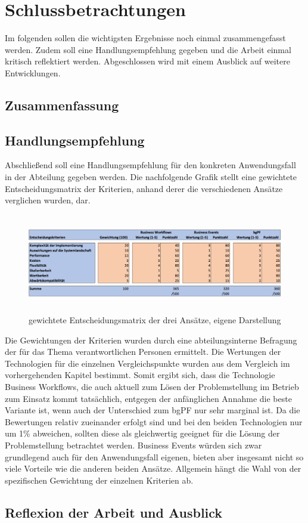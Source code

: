 \chapter{Schlussbetrachtungen}

Im folgenden sollen die wichtigsten Ergebnisse noch einmal zusammengefasst werden. Zudem soll eine Handlungsempfehlung gegeben und die Arbeit einmal kritisch reflektiert werden. Abgeschlossen wird mit einem Ausblick auf weitere Entwicklungen.

\section{Zusammenfassung}



\section{Handlungsempfehlung}

Abschlie{\ss}end soll eine Handlungsempfehlung für den konkreten Anwendungsfall in der Abteilung gegeben werden. Die nachfolgende Grafik stellt eine gewichtete Entscheidungsmatrix der Kriterien, anhand derer die verschiedenen Ansätze verglichen wurden, dar.

\begin{figure}[H]
 \centering
 \includegraphics[height=4.3cm]{Bilder/Handlungsempfehlung_Entscheidungsmatrix.png}
 \caption[gewichtete Entscheidungsmatrix der drei Ansätze]{gewichtete Entscheidungsmatrix der drei Ansätze, eigene Darstellung}
 \label{fig:iso_norm}
\end{figure}

Die Gewichtungen der Kriterien wurden durch eine abteilungsinterne Befragung der für das Thema verantwortlichen Personen ermittelt. Die Wertungen der Technologien für die einzelnen Vergleichspunkte wurden aus dem Vergleich im vorhergehenden Kapitel bestimmt. Somit ergibt sich, dass die Technologie Business Workflows, die auch aktuell zum Lösen der Problemstellung im Betrieb zum Einsatz kommt tatsächlich, entgegen der anfänglichen Annahme die beste Variante ist, wenn auch der Unterschied zum bgPF nur sehr marginal ist. Da die Bewertungen relativ zueinander erfolgt sind und bei den beiden Technologien nur um 1\% abweichen, sollten diese als gleichwertig geeignet für die Lösung der Problemstellung betrachtet werden. Business Events würden sich zwar grundlegend auch für den Anwendungsfall eigenen, bieten aber insgesamt nicht so viele Vorteile wie die anderen beiden Ansätze. Allgemein hängt die Wahl von der spezifischen Gewichtung der einzelnen Kriterien ab. 

\section{Reflexion der Arbeit und Ausblick}


